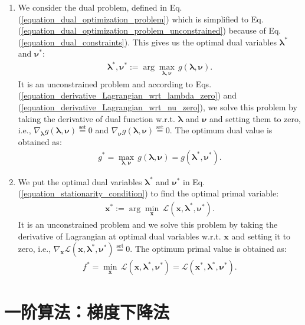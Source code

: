\documentclass[lang=cn,10pt]{gorgeousnbook}
\numberwithin{equation}{section}%
\numberwithin{figure}{section}%
\begin{document}
\begin{enumerate}
\item We consider the dual problem, defined in Eq. (\ref{equation_dual_optimization_problem}) which is simplified to Eq. (\ref{equation_dual_optimization_problem_unconstrained}) because of Eq. (\ref{equation_dual_constraints}). This gives us the optimal dual variables $\boldsymbol{\lambda}^*$ and $\boldsymbol{\nu}^*$:
\begin{align}
\boldsymbol{\lambda}^*, \boldsymbol{\nu}^* := \arg \max_{\boldsymbol{\lambda}, \boldsymbol{\nu}}\, g(\boldsymbol{\lambda},\boldsymbol{\nu}). 
\end{align}
It is an unconstrained problem and according to Eqs. (\ref{equation_derivative_Lagrangian_wrt_lambda_zero}) and (\ref{equation_derivative_Lagrangian_wrt_nu_zero}), we solve this problem by taking the derivative of dual function w.r.t. $\boldsymbol{\lambda}$ and $\boldsymbol{\nu}$ and setting them to zero, i.e., $\nabla_{\boldsymbol{\lambda}}g(\boldsymbol{\lambda},\boldsymbol{\nu}) \overset{\text{set}}{=} 0$ and $\nabla_{\boldsymbol{\nu}}g(\boldsymbol{\lambda},\boldsymbol{\nu}) \overset{\text{set}}{=} 0$.
The optimum dual value is obtained as:
\begin{align}
g^* = \max_{\boldsymbol{\lambda}, \boldsymbol{\nu}}\, g(\boldsymbol{\lambda},\boldsymbol{\nu}) = g(\boldsymbol{\lambda}^*,\boldsymbol{\nu}^*).
\end{align}
\item We put the optimal dual variables $\boldsymbol{\lambda}^*$ and $\boldsymbol{\nu}^*$ in Eq. (\ref{equation_stationarity_condition}) to find the optimal primal variable:
\begin{align}
\boldsymbol{x}^* := \arg \min_{\boldsymbol{x}}\, \mathcal{L}(\boldsymbol{x},\boldsymbol{\lambda}^*,\boldsymbol{\nu}^*). 
\end{align}
It is an unconstrained problem and we solve this problem by taking the derivative of Lagrangian at optimal dual variables w.r.t. $\boldsymbol{x}$ and setting it to zero, i.e., $\nabla_{\boldsymbol{x}}\mathcal{L}(\boldsymbol{x},\boldsymbol{\lambda}^*,\boldsymbol{\nu}^*) \overset{\text{set}}{=} 0$.
The optimum primal value is obtained as:
\begin{align}
f^* = \min_{\boldsymbol{x}}\, \mathcal{L}(\boldsymbol{x},\boldsymbol{\lambda}^*,\boldsymbol{\nu}^*) = \mathcal{L}(\boldsymbol{x}^*,\boldsymbol{\lambda}^*,\boldsymbol{\nu}^*).
\end{align}
\end{enumerate}

\section{一阶算法：梯度下降法}\label{section_first_order_methods}
\end{document}
